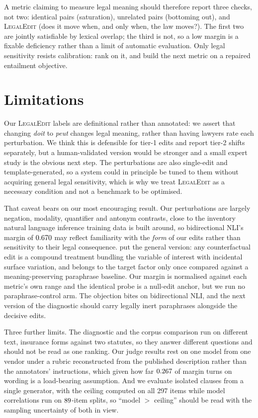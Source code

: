 \documentclass[11pt]{article}
\begin{document}
A metric claiming to measure legal meaning should therefore report three checks,
not two: identical pairs (saturation), unrelated pairs (bottoming out), and
\textsc{LegalEdit} (does it move when, and only when, the law moves?). The first
two are jointly satisfiable by lexical overlap; the third is not, so a low
margin is a fixable deficiency rather than a limit of automatic evaluation. Only
legal sensitivity resists calibration: rank on it, and build the next metric on
a repaired entailment objective.

\section*{Limitations}
\label{sec:limits}

Our \textsc{LegalEdit} labels are definitional rather than annotated: we assert
that changing \emph{doit} to \emph{peut} changes legal meaning, rather than
having lawyers rate each perturbation. We think this is defensible for tier-1
edits and report tier-2 shifts separately, but a human-validated version would
be stronger and a small expert study is the obvious next step. The perturbations
are also single-edit and template-generated, so a system could in principle be
tuned to them without acquiring general legal sensitivity, which is why we treat
\textsc{LegalEdit} as a necessary condition and not a benchmark to be optimised.

That caveat bears on our most encouraging result. Our perturbations are largely
negation, modality, quantifier and antonym contrasts, close to the inventory
natural language inference training data is built around, so bidirectional NLI's
margin of $0.670$ may reflect familiarity with the \emph{form} of our edits
rather than sensitivity to their legal consequence. \citet{yang2026compared} put
the general version: any counterfactual edit is a compound treatment bundling
the variable of interest with incidental surface variation, and belongs to the
target factor only once compared against a meaning-preserving paraphrase
baseline. Our margin is normalised against each metric's own range and the
identical probe is a null-edit anchor, but we run no paraphrase-control arm. The
objection bites on bidirectional NLI, and the next version of the diagnostic
should carry legally inert paraphrases alongside the decisive edits.

Three further limits. The diagnostic and the corpus comparison run on different
text, insurance forms against two statutes, so they answer different questions
and should not be read as one ranking. Our judge results rest on one model from
one vendor under a rubric reconstructed from the published description rather
than the annotators' instructions, which given how far $0.267$ of
margin turns on wording is a load-bearing assumption. And we evaluate isolated
clauses from a single generator, with the ceiling computed on all 297 items
while model correlations run on $89$-item splits, so ``model $>$ ceiling''
should be read with the sampling uncertainty of both in view.
\end{document}
